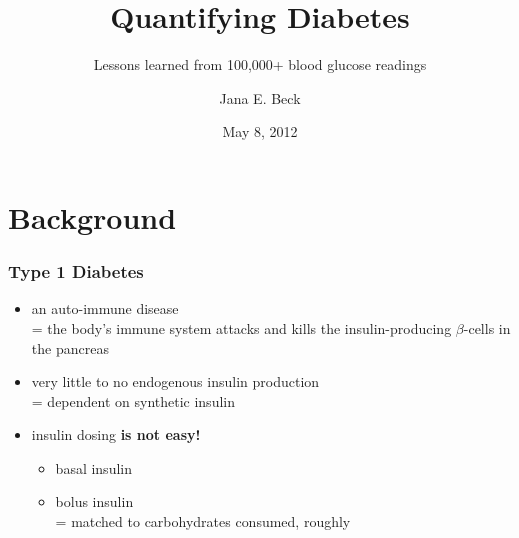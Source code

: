 \documentclass{beamer}
\author{Jana E. Beck}
\title{Quantifying Diabetes}
\subtitle{Lessons learned from 100,000+ blood glucose readings}
\date{May 8, 2012}
\begin{document}
\begin{frame}
\maketitle
\end{frame}

\section{Background}

\begin{frame}
  \frametitle{Type 1 Diabetes}

  \begin{itemize}
  \item an auto-immune disease\\
    = the body's immune system attacks and kills the insulin-producing $\beta$-cells in the
    pancreas
  \item very little to no endogenous insulin production\\
    = dependent on synthetic insulin
  \item insulin dosing \textbf{is not easy!}
    \begin{itemize}
    \item basal insulin
    \item bolus insulin\\
      = matched to carbohydrates consumed, roughly
    \end{itemize}
  \end{itemize}

\end{frame}
\end{document}
